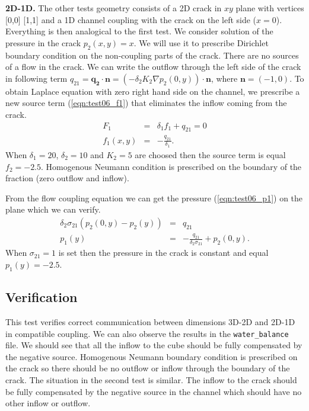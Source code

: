\textbf{2D-1D.}
The other tests geometry consists of a 2D crack in $xy$ plane with vertices [0,0] [1,1] and a 1D channel coupling with the crack on the left side ($x=0$). 
Everything is then analogical to the first test.
We consider solution of the pressure in the crack $p_2(x,y) = x$. We will use it to prescribe Dirichlet boundary condition on the non-coupling parts of the crack.
There are no sources of a flow in the crack. 
We can write the outflow through the left side of the crack in following term $q_{21} = \mathbf{q_2} \cdot \mathbf{n} = (- \delta_2 K_2 \nabla p_2(0,y))\cdot \mathbf{n}$,
where $\mathbf{n}=(-1,0)$.
To obtain Laplace equation with zero right hand side on the channel, we prescribe a new source term (\ref{eqn:test06_f1}) that eliminates the inflow coming from the crack.         
\begin{eqnarray}
    F_1 &=& \delta_1  f_1 + q_{21} = 0   \nonumber\\
    f_1(x,y) &=& -\frac{q_{21}}{\delta_1}   \label{eqn:test06_f1}.
\end{eqnarray}
When $\delta_1 = 20$, $\delta_2 = 10$ and $K_2 = 5$ are choosed then the source term is equal $f_2 = -2.5$.
Homogenous Neumann condition is prescribed on the boundary of the fraction (zero outflow and inflow).

From the flow coupling equation we can get the pressure (\ref{eqn:test06_p1}) on the plane which we can verify.
\begin{eqnarray} 
     \delta_2 \sigma_{21} ( p_2(0,y) - p_2(y) ) &=& q_{21} \nonumber\\
     p_1(y) &=& -\frac{q_{21}}{\delta_2 \sigma_{21}} + p_2(0,y) \label{eqn:test06_p1}.
\end{eqnarray}   
When $\sigma_{21} = 1$ is set then the pressure in the crack is constant and equal $p_1(y) = -2.5$.


\subsection*{Verification}
This test verifies correct communication between dimensions 3D-2D and 2D-1D in compatible coupling.
We can also observe the results in the \verb'water_balance' file. We should see that all the inflow 
to the cube should be fully compensated by the negative source. Homogenous Neumann boundary condition 
is prescribed on the crack so there should be no outflow or inflow through the boundary of the crack.
The situation in the second test is similar. The inflow to the crack should be fully compensated by 
the negative source in the channel which should have no other inflow or outflow.


